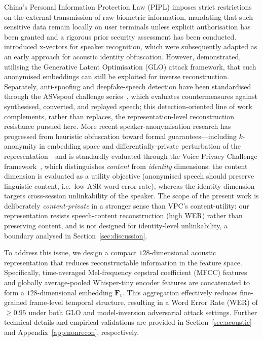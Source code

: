 \documentclass[a4paper,fleqn]{cas-sc}
\begin{document}
China's Personal Information Protection Law (PIPL) imposes strict restrictions on the external transmission of raw biometric information, mandating that such sensitive data remain locally on user terminals unless explicit authorisation has been granted and a rigorous prior security assessment has been conducted. \citet{snyder2018xvectors} introduced x-vectors for speaker recognition, which were subsequently adapted as an early approach for acoustic identity obfuscation. However, \citet{23} demonstrated, utilising the Generative Latent Optimisation (GLO) attack framework, that such anonymised embeddings can still be exploited for inverse reconstruction. Separately, anti-spoofing and deepfake-speech detection have been standardised through the ASVspoof challenge series~\citep{yamagishi2021asvspoof}, which evaluates countermeasures against synthesised, converted, and replayed speech; this detection-oriented line of work complements, rather than replaces, the representation-level reconstruction resistance pursued here. More recent speaker-anonymisation research has progressed from heuristic obfuscation toward formal guarantees---including $k$-anonymity in embedding space and differentially-private perturbation of the representation---and is standardly evaluated through the Voice Privacy Challenge framework~\citep{22}, which distinguishes \textit{content} from \textit{identity} dimensions: the content dimension is evaluated as a utility objective (anonymised speech should preserve linguistic content, i.e.\ low ASR word-error rate), whereas the identity dimension targets cross-session unlinkability of the speaker. The scope of the present work is deliberately \textit{content-private} in a stronger sense than VPC's content-utility: our representation resists speech-content reconstruction (high WER) rather than preserving content, and is not designed for identity-level unlinkability, a boundary analysed in Section~\ref{sec:discussion}.

To address this issue, we design a compact $128\text{-dimensional}$ acoustic representation that reduces reconstructable information in the feature space. Specifically, time-averaged Mel-frequency cepstral coefficient (MFCC) features and globally average-pooled Whisper-tiny encoder features are concatenated to form a $128\text{-dimensional}$ embedding $\bm{F}_v$. This aggregation effectively reduces fine-grained frame-level temporal structure, resulting in a Word Error Rate (WER) of $\ge 0.95$ under both GLO and model-inversion adversarial attack settings. Further technical details and empirical validations are provided in Section~\ref{sec:acoustic} and Appendix~\ref{app:nonrecon}, respectively.
\end{document}
